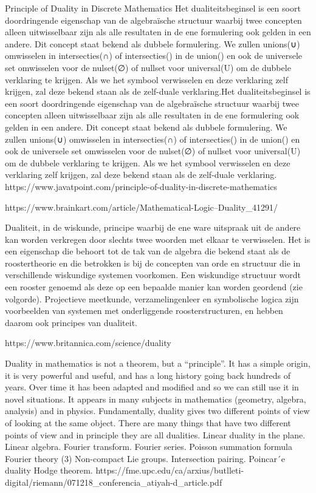 \documentclass{article}
\begin{document}
	
	Principle of Duality in Discrete Mathematics
Het dualiteitsbeginsel is een soort doordringende eigenschap van de algebraïsche structuur waarbij twee concepten alleen uitwisselbaar zijn als alle resultaten in de ene formulering ook gelden in een andere. Dit concept staat bekend als dubbele formulering. We zullen unions(∪) omwisselen in intersecties(∩) of intersecties() in de union() en ook de universele set omwisselen voor de nulset(∅) of nullset voor universal(U) om de dubbele verklaring te krijgen. Als we het symbool verwisselen en deze verklaring zelf krijgen, zal deze bekend staan als de zelf-duale verklaring.Het dualiteitsbeginsel is een soort doordringende eigenschap van de algebraïsche structuur waarbij twee concepten alleen uitwisselbaar zijn als alle resultaten in de ene formulering ook gelden in een andere. Dit concept staat bekend als dubbele formulering. We zullen unions(∪) omwisselen in intersecties(∩) of intersecties() in de union() en ook de universele set omwisselen voor de nulset(∅) of nullset voor universal(U) om de dubbele verklaring te krijgen. Als we het symbool verwisselen en deze verklaring zelf krijgen, zal deze bekend staan als de zelf-duale verklaring.
	https://www.javatpoint.com/principle-of-duality-in-discrete-mathematics
	
	
	https://www.brainkart.com/article/Mathematical-Logic--Duality_41291/
	
	
Dualiteit, in de wiskunde, principe waarbij de ene ware uitspraak uit de andere kan worden verkregen door slechts twee woorden met elkaar te verwisselen. Het is een eigenschap die behoort tot de tak van de algebra die bekend staat als de roostertheorie en die betrokken is bij de concepten van orde en structuur die in verschillende wiskundige systemen voorkomen. Een wiskundige structuur wordt een rooster genoemd als deze op een bepaalde manier kan worden geordend (zie volgorde). Projectieve meetkunde, verzamelingenleer en symbolische logica zijn voorbeelden van systemen met onderliggende roosterstructuren, en hebben daarom ook principes van dualiteit.
	
	https://www.britannica.com/science/duality
	
	
	Duality in mathematics is not a theorem, but a “principle”. It has a
	simple origin, it is very powerful and useful, and has a long history going
	back hundreds of years. Over time it has been adapted and modified
	and so we can still use it in novel situations. It appears in many
	subjects in mathematics (geometry, algebra, analysis) and in physics.
	Fundamentally, duality gives two different points of view of looking at
	the same object. There are many things that have two different points
	of view and in principle they are all dualities.
	Linear duality in the plane. 
	Linear algebra.
	Fourier transform.
	Fourier series.
	Poisson summation formula
	Fourier theory
	(3) Non-compact Lie groups.
	Intersection pairing.
	Poincar´e duality
	Hodge theorem.
	https://fme.upc.edu/ca/arxius/butlleti-digital/riemann/071218_conferencia_atiyah-d_article.pdf
	
\end{document}
